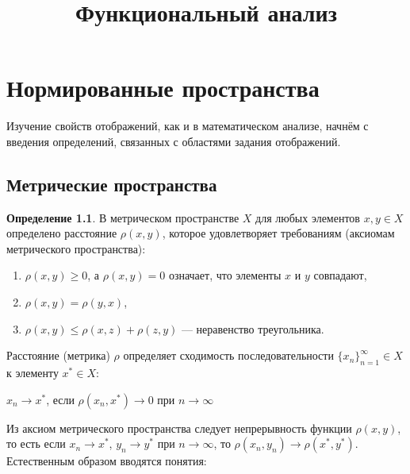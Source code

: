 \documentclass[12pt,a4paper,titlepage]{book}
\title{Функциональный анализ}
\theoremstyle{definition}
\newtheorem*{definition}{Определение}
\theoremstyle{plain}
\theoremstyle{remark}
\theoremstyle{remark}
\theoremstyle{remark}
\theoremstyle{plain}
\begin{document}
\chapter{Нормированные пространства}

Изучение свойств отображений, как и в математическом анализе, начнём с введения определений, связанных с областями задания отображений.

\section{Метрические пространства}

\begin{definition}В метрическом пространстве $X$ для любых элементов $x,y\in X$ определено расстояние $\rho(x, y)$, которое удовлетворяет требованиям (аксиомам метрического пространства):

\begin{enumerate}

	\item $\rho(x, y)\geqslant 0$, а $\rho(x, y)=0$ означает, что элементы $x$ и $y$ совпадают,

	\item $\rho(x, y)=\rho(y, x)$,

	\item $ \rho(x, y)\leqslant \rho(x, z) +\rho(z, y)$ --- неравенство треугольника.
	
\end{enumerate} 

\end{definition}

Расстояние (метрика) $\rho$ определяет сходимость последовательности $\lbrace x_n \rbrace_{n=1}^{\infty}  \in X$ к элементу $x^{*}\in X$:

\begin{center}

$x_n\rightarrow x^{*}$, если $\rho(x_n, x^{*})\rightarrow 0$ при $n\rightarrow\infty$

\end{center}

Из аксиом метрического пространства следует непрерывность функции $\rho(x, y)$, то есть если $x_n\rightarrow x^{*}$, $y_n\rightarrow y^{*}$ при $n\rightarrow\infty$, то $\rho(x_n, y_n)\rightarrow \rho(x^*, y^*)$.\\

Естественным образом вводятся понятия:
\end{document}
